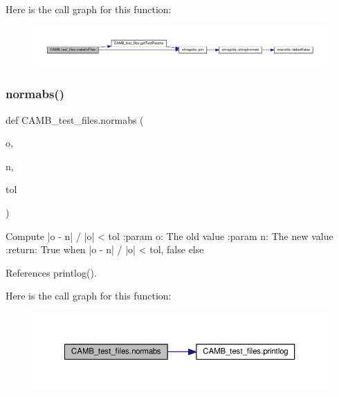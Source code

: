 Here is the call graph for this function\+:
\nopagebreak
\begin{figure}[H]
\begin{center}
\leavevmode
\includegraphics[width=350pt]{namespaceCAMB__test__files_a2071b2434992a52dd7fc9c49db14d86d_cgraph}
\end{center}
\end{figure}
\mbox{\label{namespaceCAMB__test__files_a942fd27486efa4cad8f9592101d8d6b4}} 
\subsubsection{\texorpdfstring{normabs()}{normabs()}}
{\footnotesize\ttfamily def C\+A\+M\+B\+\_\+test\+\_\+files.\+normabs (\begin{DoxyParamCaption}\item[{}]{o,  }\item[{}]{n,  }\item[{}]{tol }\end{DoxyParamCaption})}

\begin{DoxyVerb}Compute |o - n| / |o| < tol
:param o: The old value
:param n: The new value
:return: True when |o - n| / |o| < tol, false else
\end{DoxyVerb}
 

References printlog().

Here is the call graph for this function\+:
\nopagebreak
\begin{figure}[H]
\begin{center}
\leavevmode
\includegraphics[width=350pt]{namespaceCAMB__test__files_a942fd27486efa4cad8f9592101d8d6b4_cgraph}
\end{center}
\end{figure}
\mbox{\label{namespaceCAMB__test__files_a79f9b0e8484d9f397e2dc4addc178620}} 
